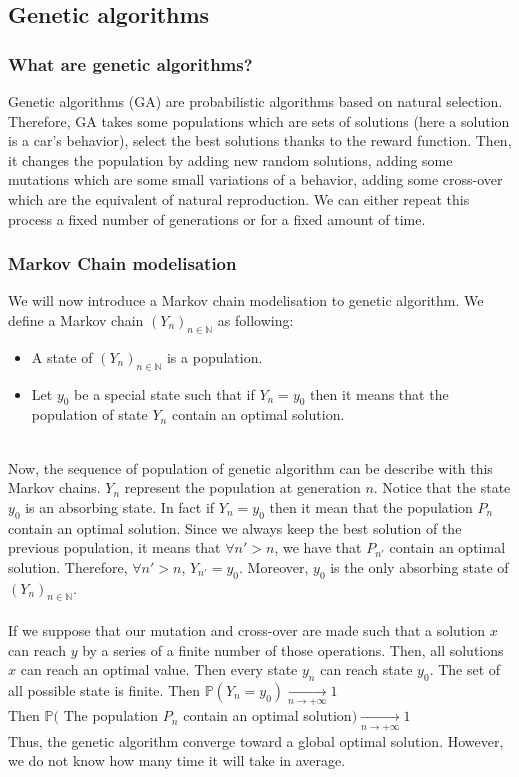 \documentclass[11pt,a4paper]{article}
\newcommand{\tab}{\phantom{xxx}}
\newcommand{\mlist}[1]{\begin{itemize}[noitemsep,topsep=0pt]#1\end{itemize}}
\begin{document}
	
		\subsection*{Genetic algorithms}
			\subsubsection*{What are genetic algorithms?}
Genetic algorithms (GA) are probabilistic algorithms based on natural selection. Therefore, GA takes some populations which are sets of solutions (here a solution is a car's behavior), select the best solutions thanks to the reward function. Then, it changes the population by adding new random solutions, adding some mutations which are some small variations of a behavior, adding some cross-over which are the equivalent of natural reproduction. We can either repeat this process a fixed number of generations or for a fixed amount of time.
		
			\subsubsection*{Markov Chain modelisation}
We will now introduce a Markov chain modelisation to genetic algorithm. We define a Markov chain $(Y_n)_{n\in\mathbb{N}}$ as following:
\mlist{
\item A state of $(Y_n)_{n\in\mathbb{N}}$ is a population.
\item Let $y_0$ be a special state such that if $Y_n = y_0$ then it means that the population of state $Y_n$ contain an optimal solution.
}
\tab \\
Now, the sequence of population of genetic algorithm can be describe with this Markov chains. $Y_n$ represent the population at generation $n$. Notice that the state $y_0$ is an absorbing state. In fact if $Y_n = y_0$ then it mean that the population $P_n$ contain an optimal solution. Since we always keep the best solution of the previous population, it means that $\forall n'>n$, we have that $P_{n'}$ contain an optimal solution. Therefore, $\forall n'>n$, $Y_{n'} = y_0$. Moreover, $y_0$ is the only absorbing state of $(Y_n)_{n\in\mathbb{N}}$.\\
\\
If we suppose that our mutation and cross-over are made such that a solution $x$ can reach $y$ by a series of a finite number of those operations. Then, all solutions $x$ can reach an optimal value. Then every state $y_n$ can reach state $y_0$. The set of all possible state is finite. Then $\mathbb{P}(Y_n = y_0) \underset{n \rightarrow +\infty}{\rightarrow} 1$\\
Then $\mathbb{P}($ The population $P_n$ contain an optimal solution$) \underset{n \rightarrow +\infty}{\rightarrow} 1$\\
Thus, the genetic algorithm converge toward a global optimal solution. However, we do not know how many time it will take in average.
		
\end{document}
